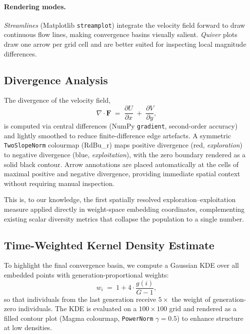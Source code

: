 \documentclass{article}
\begin{document}
\paragraph{Rendering modes.}
\emph{Streamlines} (Matplotlib \texttt{streamplot}) integrate the velocity
field forward to draw continuous flow lines, making convergence basins
visually salient.
\emph{Quiver} plots draw one arrow per grid cell and are better suited for
inspecting local magnitude differences.

\subsection{Divergence Analysis}
\label{sec:divergence}

The divergence of the velocity field,
\begin{equation}
  \nabla \cdot \mathbf{F} \;=\; \frac{\partial U}{\partial x}
    \;+\; \frac{\partial V}{\partial y},
  \label{eq:divergence}
\end{equation}
is computed via central differences (NumPy \texttt{gradient}, second-order
accuracy) and lightly smoothed to reduce finite-difference edge artefacts.
A symmetric \texttt{TwoSlopeNorm} colourmap (RdBu\_r) maps positive
divergence (red, \emph{exploration}) to negative divergence
(blue, \emph{exploitation}), with the zero boundary rendered as a solid
black contour.
Arrow annotations are placed automatically at the cells of maximal positive
and negative divergence, providing immediate spatial context without
requiring manual inspection.

This is, to our knowledge, the first spatially resolved exploration--exploitation
measure applied directly in weight-space embedding coordinates, complementing
existing scalar diversity metrics \citep{eiben2003introduction} that collapse
the population to a single number.

\subsection{Time-Weighted Kernel Density Estimate}
\label{sec:kde}

To highlight the final convergence basin, we compute a Gaussian KDE over all
embedded points with generation-proportional weights:
\begin{equation}
  w_i \;=\; 1 + 4 \cdot \frac{g(i)}{G-1},
  \label{eq:timeweight}
\end{equation}
so that individuals from the last generation receive $5\times$ the weight of
generation-zero individuals.
The KDE is evaluated on a $100 \times 100$ grid and rendered as a filled
contour plot (Magma colourmap, \texttt{PowerNorm} $\gamma = 0.5$) to enhance
structure at low densities.
\end{document}
